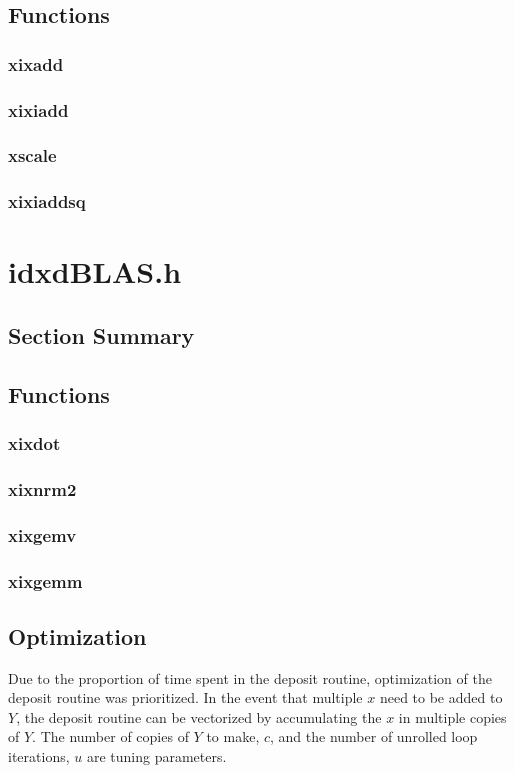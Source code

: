 \documentclass[12pt]{article}
\theoremstyle{definition}
\numberwithin{equation}{section}
\numberwithin{figure}{section}
\begin{document}
  \subsection{Functions}
    \subsubsection{xixadd}
    \subsubsection{xixiadd}
    \subsubsection{xscale}
    \subsubsection{xixiaddsq}
\section{idxdBLAS.h}
  \label{sec:idxdBLAS}
  \subsection{Section Summary}
  \subsection{Functions}
    \subsubsection{xixdot}
    \subsubsection{xixnrm2}
    \subsubsection{xixgemv}
    \subsubsection{xixgemm}
  \subsection{Optimization}
    Due to the proportion of time spent in the deposit routine, optimization of the deposit routine was prioritized. In the event that multiple $x$ need to be added to $Y$, the deposit routine can be vectorized by accumulating the $x$ in multiple copies of $Y$. The number of copies of $Y$ to make, $c$, and the number of unrolled loop iterations, $u$ are tuning parameters.
\end{document}
